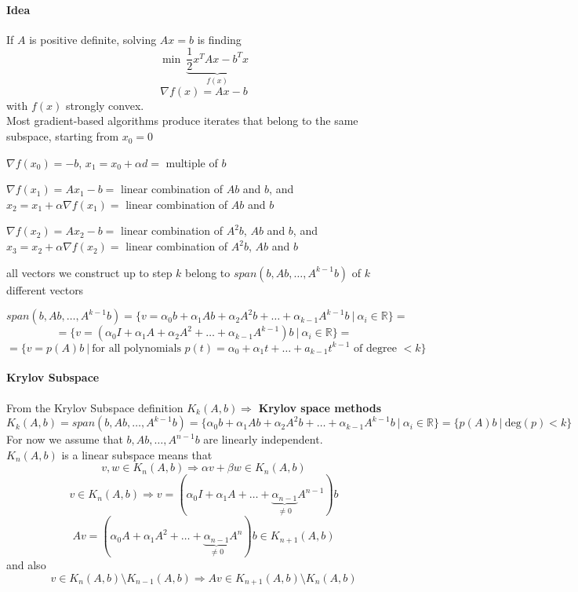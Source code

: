 \documentclass[10pt]{report}
\begin{document}
\paragraph{Idea} If $A$ is positive definite, solving $Ax=b$ is finding $$\min\:\underset{f(x)}{\underbrace{\frac{1}{2}x^TAx - b^Tx}}$$ $$\nabla f(x) = Ax-b$$ with $f(x)$ strongly convex. \\
Most gradient-based algorithms produce iterates that belong to the same subspace, starting from $x_0 = 0$\begin{list}{}{}
	\item $\nabla f(x_0) = -b$, $x_1 = x_0+\alpha d=$ multiple of $b$
	\item $\nabla f(x_1) = Ax_1-b=$ linear combination of $Ab$ and $b$, and $x_2=x_1+\alpha\nabla f(x_1) =$ linear combination of $Ab$ and $b$
	\item $\nabla f(x_2) = Ax_2-b=$ linear combination of $A^2b$, $Ab$ and $b$, and $x_3=x_2+\alpha\nabla f(x_2) =$ linear combination of $A^2b$, $Ab$ and $b$
	\item[$\Rightarrow$] all vectors we construct up to step $k$ belong to $span(b,Ab,\ldots,A^{k-1}b)$ of $k$ different vectors
\end{list}
$$span(b,Ab,\ldots,A^{k-1}b) = \{v=\alpha_0b+\alpha_1Ab+\alpha_2A^2b+\ldots+\alpha_{k-1}A^{k-1}b\:|\:\alpha_i\in \mathbb{R}\}=$$
$$=\{v = (\alpha_0I+\alpha_1A+\alpha_2A^2+\ldots+\alpha_{k-1}A^{k-1})b\:|\:\alpha_i\in \mathbb{R}\} = $$
$$ = \{v=p(A)b\:|\:\text{for all polynomials }p(t)=\alpha_0+\alpha_1t+\ldots+a_{k-1}t^{k-1}\text{ of degree }<k\}$$

\paragraph{Krylov Subspace} From the Krylov Subspace definition $K_k(A,b)\Rightarrow$ \textbf{Krylov space methods}
$$K_k(A,b) = span(b,Ab,\ldots,A^{k-1}b) = \{\alpha_0b+\alpha_1Ab+\alpha_2A^2b+\ldots+\alpha_{k-1}A^{k-1}b\:|\:\alpha_i\in \mathbb{R}\} = \{p(A)b\:|\:\text{deg}(p)<k\}$$
For now we assume that $b, Ab, \ldots, A^{n-1}b$ are linearly independent.\\
$K_n(A,b)$ is a linear subspace means that $$v,w\in K_n(A,b)\Rightarrow \alpha v+\beta w\in K_n(A,b)$$
$$v\in K_n(A,b)\Rightarrow v=(\alpha_0 I + \alpha_1 A + \ldots + \underset{\neq 0}{\underbrace{\alpha_{n-1}}} A^{n-1})b$$ $$Av = (\alpha_0A + \alpha_1 A^2+\ldots + \underset{\neq 0}{\underbrace{\alpha_{n-1}}} A^n)b \in K_{n+1}(A,b)$$ and also $$v\in K_n(A,b) \setminus K_{n-1}(A,b)\Rightarrow Av \in K_{n+1}(A,b)\setminus K_n(A,b)$$
\end{document}
